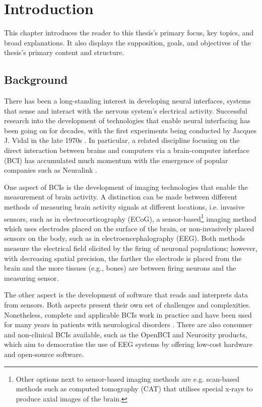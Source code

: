 \chapter{Introduction}
\graphicspath{{Chapter1/Figs/}{Chapter1/Figs/}}

This chapter introduces the reader to this thesis's primary focus, key topics, and broad explanations. It also displays the supposition, goals, and objectives of the thesis's primary content and structure.

\section{Background}
\label{chapter1-background}

There has been a long-standing interest in developing neural interfaces, systems that sense and interact with the nervous system's electrical activity. Successful research into the development of technologies that enable neural interfacing has been going on for decades, with the first experiments being conducted by Jacques J. Vidal in the late 1970s \citep{vidal_real-time_1977}. In particular, a related discipline focusing on the direct interaction between brains and computers via a brain-computer interface (BCI) has accumulated much momentum with the emergence of popular companies such as Neuralink \citep{mor_brain-computer_2021}.

One aspect of BCIs is the development of imaging technologies that enable the measurement of brain activity. A distinction can be made between different methods of measuring brain activity signals at different locations, i.e. invasive sensors, such as in electrocorticography (ECoG), a sensor-based\footnote{Other options next to sensor-based imaging methods are e.g. scan-based methods such as computed tomography (CAT) that utilises special x-rays to produce axial images of the brain.} imaging method which uses electrodes placed on the surface of the brain, or non-invasively placed sensors on the body, such as in electroencephalography (EEG). Both methods measure the electrical field elicited by the firing of neuronal populations; however, with decreasing spatial precision, the farther the electrode is placed from the brain and the more tissues (e.g., bones) are between firing neurons and the measuring sensor.

The other aspect is the development of software that reads and interprets data from sensors. Both aspects present their own set of challenges and complexities. Nonetheless, complete and applicable BCIs work in practice and have been used for many years in patients with neurological disorders \citep{braingate_publications_nodate}. There are also consumer and non-clinical BCIs available, such as the OpenBCI and Neurosity products, which aim to democratise the use of EEG systems by offering low-cost hardware and open-source software.

